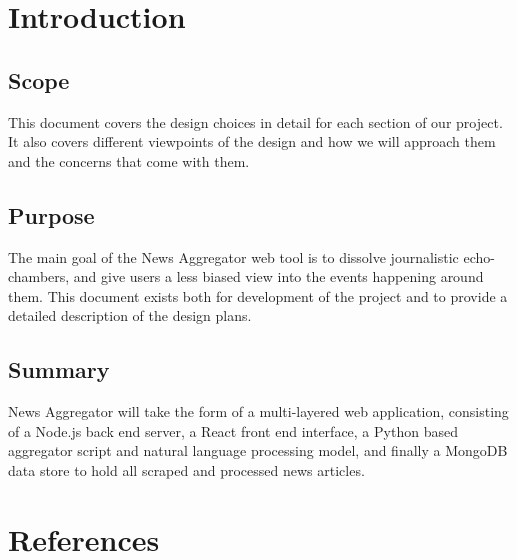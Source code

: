 \documentclass[onecolumn, draftclsnofoot,10pt, compsoc]{IEEEtran}
\begin{document}
\newpage
{}
\tableofcontents
\clearpage
\section{Introduction}
\subsection{Scope}
This document covers the design choices in detail for each section of our project. It also covers different viewpoints of the design and how we will approach them and the concerns that come with them.
\subsection{Purpose}
The main goal of the News Aggregator web tool is to dissolve journalistic echo-chambers, and give users a less biased view into the events happening around them. This document exists both for development of the project and to provide a detailed description of the design plans.
\subsection{Summary}
News Aggregator will take the form of a multi-layered web application, consisting of a Node.js back end server, a React front end interface, a Python based aggregator script and natural language processing model, and finally a MongoDB data store to hold all scraped and processed news articles.
\section{References}
\begingroup
\renewcommand{\addcontentsline}[3]{}%
\renewcommand{\section}[2]{}%


\endgroup
\end{document}
